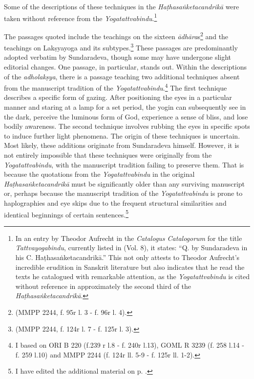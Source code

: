 Some of the descriptions of these techniques in the \emph{Haṭhasaṅketacandrikā} were taken without reference from the \textit{Yogatattvabindu}.\footnote{In an entry by Theodor Aufrecht in the \emph{Catalogus Catalogorum} for the title \emph{Tattvayogabindu}, currently listed in  (Vol. 8), it states: “Q. by Sundaradeva in his C. Haṭhasaṅketacandrikā.” This not only attests to Theodor Aufrecht's incredible erudition in Sanskrit literature but also indicates that he read the texts he catalogued with remarkable attention, as the \textit{Yogatattvabindu} is cited without reference in approximately the second third of the \emph{Haṭhasaṅketacandrikā}.}

The passages quoted include the teachings on the sixteen \textit{ādhāra}s\footnote{ (MMPP 2244, f. 95r l. 3 - f. 96r l. 4).} and the teachings on Lakṣyayoga and its subtypes.\footnote{ (MMPP 2244, f. 124r l. 7 - f. 125r l. 3).} These passages are predominantly adopted verbatim by Sundaradeva, though some may have undergone slight editorial changes. One passage, in particular, stands out. Within the descriptions of the \emph{adholakṣya}, there is a passage teaching two additional techniques absent from the manuscript tradition of the \emph{Yogatattvabindu}.\footnote{ I based on ORI B 220 (f.239 r l.8 - f. 240r l.13), GOML R 3239 (f. 258 l.14 - f. 259 l.10) and MMPP 2244 (f. 124r ll. 5-9 - f. 125r ll. 1-2).} The first technique describes a specific form of gazing. After positioning the eyes in a particular manner and staring at a lamp for a set period, the yogin can subsequently see in the dark, perceive the luminous form of God, experience a sense of bliss, and lose bodily awareness. The second technique involves rubbing the eyes in specific spots to induce further light phenomena. The origin of these techniques is uncertain. Most likely, these additions originate from Sundaradeva himself. However, it is not entirely impossible that these techniques were originally from the \emph{Yogatattvabindu}, with the manuscript tradition failing to preserve them. That is because the quotations from the \emph{Yogatattvabindu} in the original \emph{Haṭhasaṅketacandrikā} must be significantly older than any surviving manuscript or, perhaps because the manuscript tradition of the \emph{Yogatattvabindu} is prone to haplographies and eye skips due to the frequent structural similarities and identical beginnings of certain sentences.\footnote{I have edited the additional material on p. \pageref{sanketaextra}.}

